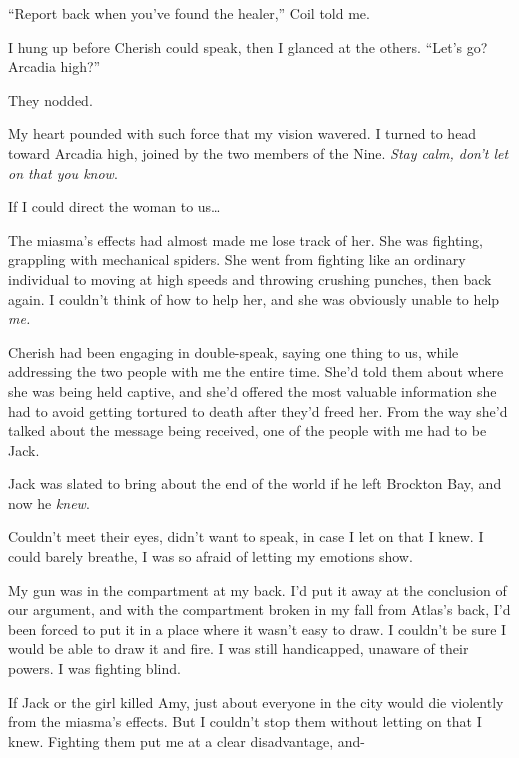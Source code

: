 ``Report back when you've found the healer,'' Coil told me.



I hung up before Cherish could speak, then I glanced at the others.  ``Let's go?  Arcadia high?''



They nodded.



My heart pounded with such force that my vision wavered.  I turned to head toward Arcadia high, joined by the two members of the Nine.  \emph{Stay calm, don't let on that you know}.



If I could direct the woman to us\ldots



The miasma's effects had almost made me lose track of her.  She was fighting, grappling with mechanical spiders.  She went from fighting like an ordinary individual to moving at high speeds and throwing crushing punches, then back again.  I couldn't think of how to help her, and she was obviously unable to help \emph{me.}



Cherish had been engaging in double-speak, saying one thing to us, while addressing the two people with me the entire time.  She'd told them about where she was being held captive, and she'd offered the most valuable information she had to avoid getting tortured to death after they'd freed her.  From the way she'd talked about the message being received, one of the people with me had to be Jack.



Jack was slated to bring about the end of the world if he left Brockton Bay, and now he \emph{knew}.



Couldn't meet their eyes, didn't want to speak, in case I let on that I knew.  I could barely breathe, I was so afraid of letting my emotions show.



My gun was in the compartment at my back.  I'd put it away at the conclusion of our argument, and with the compartment broken in my fall from Atlas's back, I'd been forced to put it in a place where it wasn't easy to draw.  I couldn't be sure I would be able to draw it and fire.  I was still handicapped, unaware of their powers.  I was fighting blind.



If Jack or the girl killed Amy, just about everyone in the city would die violently from the miasma's effects.  But I couldn't stop them without letting on that I knew.  Fighting them put me at a clear disadvantage, and-



